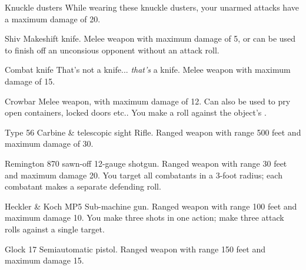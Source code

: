 
\begin{describe}{Knuckle dusters}
  While wearing these knuckle dusters, your unarmed attacks have a maximum damage of 20.
\end{describe}

\begin{describe}{Shiv}
  Makeshift knife. Melee weapon with maximum damage of 5, or can be used to finish off an unconsious opponent without an attack roll.
\end{describe}

\begin{describe}{Combat knife}
  That's not a knife... \emph{that's} a knife. Melee weapon with maximum damage of 15.
\end{describe}

\begin{describe}{Crowbar}
  Melee weapon, with maximum damage of 12. Can also be used to pry open containers, locked doors etc.. You make a  roll against the object's .
\end{describe}

\begin{describe}{Type 56 Carbine \& telescopic sight}
  Rifle. Ranged weapon with range 500 feet and maximum damage of 30.
\end{describe}

\begin{describe}{Remington 870 sawn-off}
  12-gauge shotgun. Ranged weapon with range 30 feet and maximum damage 20. You target all combatants in a 3-foot radius; each combatant makes a separate defending roll.
\end{describe}

\begin{describe}{Heckler \& Koch MP5}
  Sub-machine gun. Ranged weapon with range 100 feet and maximum damage 10. You make three shots in one action; make three attack rolls against a single target.
\end{describe}

\begin{describe}{Glock 17}
  Semiautomatic pistol. Ranged weapon with range 150 feet and maximum damage 15.
\end{describe}

